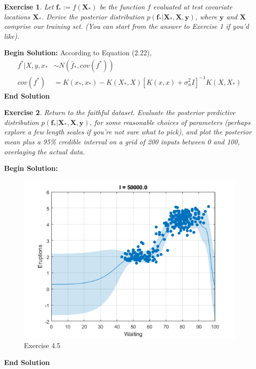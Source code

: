 \documentclass[twoside]{article}
\newcounter{lecnum}
\newtheorem{exercise}{Exercise}[lecnum]
\begin{document}
\begin{exercise}
  Let $\mathbf{f}_*:=f(\mathbf{X}_*)$ be the function $f$ evaluated at test covariate locations $\mathbf{X}_*$. Derive the posterior distribution $p(\mathbf{f}_*|\mathbf{X}_*,\mathbf{X},\mathbf{y})$, where $\mathbf{y}$ and $\mathbf{X}$ comprise our training set. (You can start from the answer to Exercise 1 if you'd like).

\end{exercise}

\textbf{Begin Solution:}
According to Equation (2.22),
\begin{equation*}
\begin{split}
f^*|X,y,x_*&\sim N(\bar{f}_*,cov(f^*))\\
cov(f^*)&=K(x_*,x_*)-K(X_*,X)\left[ K(x,x) + \sigma_n^2I\right]^{-1}K(X,X_*)
\end{split}
\end{equation*}
\textbf{End Solution}

\begin{exercise}
Return to the faithful dataset. Evaluate the posterior predictive distribution 
$p(\mathbf{f}_*|\mathbf{X}_*,\mathbf{X},\mathbf{y})$, for some reasonable choices of parameters (perhaps explore a few length scales if you're not sure what to pick), and plot the posterior mean plus a 95\% credible interval on a grid of 200 inputs between 0 and 100, overlaying the actual data.
\end{exercise}

\textbf{Begin Solution:}
\begin{figure}[H]
\begin{center}
\includegraphics[width=\textwidth]{./Exercise45/exercise44.png}
\end{center}
\caption{Exercise 4.5}
\end{figure} 
\textbf{End Solution}
\end{document}
